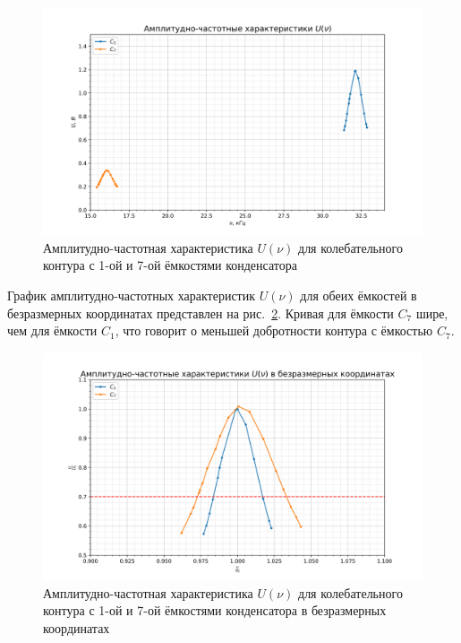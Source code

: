 \documentclass[a4paper, 12pt]{article}
\begin{document}
\begin{figure}[h!]
\begin{center}
    \includegraphics[scale=0.7]{3.2.3_1.png}
\end{center}
\caption{Амплитудно-частотная характеристика $U(\nu)$ для колебательного контура с 1-ой и 7-ой ёмкостями конденсатора}
\label{plot1}
\end{figure}

\newpage

График амплитудно-частотных характеристик $U(\nu)$ для обеих ёмкостей в безразмерных координатах представлен на рис.~\ref{plot2}. Кривая для ёмкости $C_7$ шире, чем для ёмкости $C_1$, что говорит о меньшей добротности контура с ёмкостью $C_7$.

\begin{figure}[h!]
\begin{center}
    \includegraphics[scale=0.7]{3.2.3_2.png}
\end{center}
\caption{Амплитудно-частотная характеристика $U(\nu)$ для колебательного контура с 1-ой и 7-ой ёмкостями конденсатора в безразмерных координатах}
\label{plot2}
\end{figure}
\end{document}

